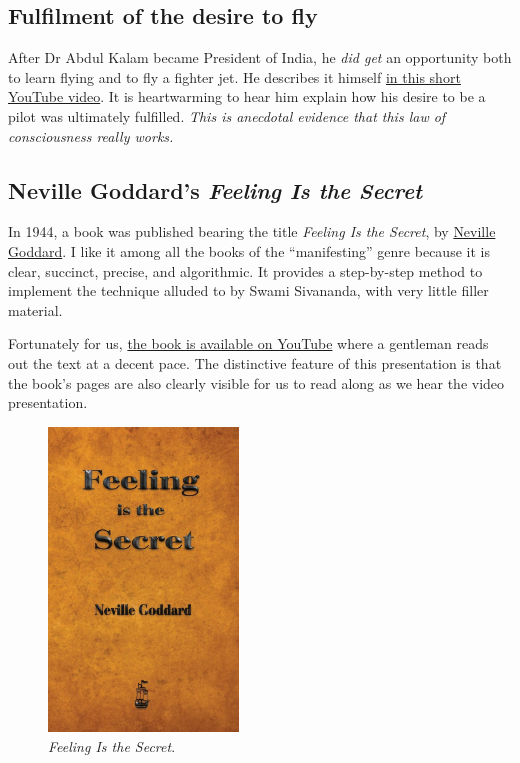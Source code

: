 \documentclass[
  a4paper,
]{article}
\begin{document}
\hypertarget{fulfilment-of-the-desire-to-fly}{%
\subsection{Fulfilment of the desire to
fly}\label{fulfilment-of-the-desire-to-fly}}

After Dr Abdul Kalam became President of India, he \emph{did get} an
opportunity both to learn flying and to fly a fighter jet. He describes
it himself \href{https://www.youtube.com/shorts/kWnxd3af4rM}{in this
short YouTube video}. It is heartwarming to hear him explain how his
desire to be a pilot was ultimately fulfilled. \emph{This is anecdotal
evidence that this law of consciousness really works.}

\hypertarget{neville-goddards-feeling-is-the-secret}{%
\subsection{\texorpdfstring{Neville Goddard's \emph{Feeling Is the
Secret}}{Neville Goddard's Feeling Is the Secret}}\label{neville-goddards-feeling-is-the-secret}}

In 1944, a book was published bearing the title \emph{Feeling Is the
Secret}, by \href{feeling\%20is\%20the\%20secret}{Neville Goddard}. I
like it among all the books of the ``manifesting'' genre because it is
clear, succinct, precise, and algorithmic. It provides a step-by-step
method to implement the technique alluded to by Swami Sivananda, with
very little filler material.

Fortunately for us,
\href{https://www.youtube.com/watch?v=ffNWoefuwPM}{the book is available
on YouTube} where a gentleman reads out the text at a decent pace. The
distinctive feature of this presentation is that the book's pages are
also clearly visible for us to read along as we hear the video
presentation.

\begin{figure}
\centering
\includegraphics[width=0.45\textwidth,height=\textheight]{images/Feeling-is-the-Secret.jpg}
\caption{\emph{Feeling Is the Secret}.}
\end{figure}
\end{document}
